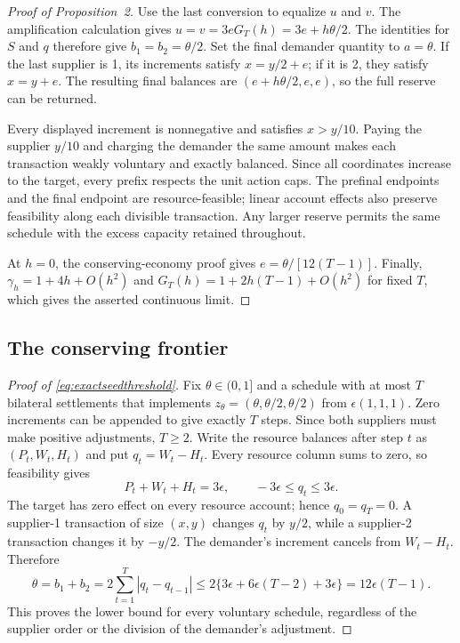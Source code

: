 \documentclass[ecta,draft,supplement]{econsocart}
\theoremstyle{definition}
\theoremstyle{definition}
\begin{document}
\begin{appendix}
\begin{proof}[Proof of Proposition~2%
]
Use the last conversion to equalize $u$ and $v$. The amplification
calculation gives $u=v=3eG_T(h)=3e+h\theta/2$. The identities for
$S$ and $q$ therefore give $b_1=b_2=\theta/2$.
Set the final demander quantity to $a=\theta$. If the last supplier
is 1, its increments satisfy $x=y/2+e$; if it is 2, they satisfy
$x=y+e$. The resulting final balances are
$(e+h\theta/2,e,e)$, so the full reserve can be returned.

Every displayed increment is nonnegative and satisfies $x>y/10$.
Paying the supplier $y/10$ and charging the demander the same amount
makes each transaction weakly voluntary and exactly balanced. Since all
coordinates increase to the target, every prefix respects the unit action
caps. The prefinal endpoints and the final endpoint are resource-feasible;
linear account effects also preserve feasibility along each divisible
transaction. Any larger reserve permits the same schedule with the excess
capacity retained throughout.

At $h=0$, the conserving-economy proof gives
$e=\theta/[12(T-1)]$. Finally,
$\gamma_h=1+4h+O(h^2)$ and
$G_T(h)=1+2h(T-1)+O(h^2)$ for fixed $T$, which gives the asserted
continuous limit.
\end{proof}

\subsection{The conserving frontier}
\label{app:exactseed}

\begin{proof}[Proof of \eqref{eq:exactseedthreshold}]
Fix $\theta\in(0,1]$ and a schedule with at most $T$ bilateral
settlements that implements $z_\theta=(\theta,\theta/2,\theta/2)$
from $\epsilon(1,1,1)$. Zero increments can be appended to give exactly
$T$ steps. Since both suppliers must make positive adjustments, $T\geq2$.
Write the resource balances after step $t$ as $(P_t,W_t,H_t)$ and put
$q_t=W_t-H_t$. Every resource column sums to zero, so feasibility gives
\[
 P_t+W_t+H_t=3\epsilon,
 \qquad -3\epsilon\leq q_t\leq3\epsilon.
\]
The target has zero effect on every resource account; hence
$q_0=q_T=0$. A supplier-1 transaction of size $(x,y)$ changes $q_t$
by $y/2$, while a supplier-2 transaction changes it by $-y/2$.
The demander's increment cancels from $W_t-H_t$. Therefore
\[
 \theta=b_1+b_2
   =2\sum_{t=1}^T|q_t-q_{t-1}|
   \leq 2\{3\epsilon+6\epsilon(T-2)+3\epsilon\}
   =12\epsilon(T-1).
\]
This proves the lower bound for every voluntary schedule, regardless of
the supplier order or the division of the demander's adjustment.


\end{proof}
\end{appendix}
\end{document}
